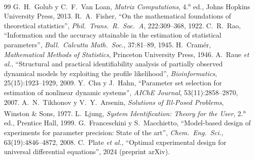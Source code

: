 \documentclass[11pt,a4paper]{article}
\begin{document}
\begin{thebibliography}{99}
 G.~H.~Golub y C.~F.~Van Loan, \emph{Matrix Computations}, 4.\textsuperscript{a} ed., Johns Hopkins University Press, 2013.
 R.~A.~Fisher, ``On the mathematical foundations of theoretical statistics'', \emph{Phil.\ Trans.\ R.\ Soc.\ A}, 222:309--368, 1922.
 C.~R.~Rao, ``Information and the accuracy attainable in the estimation of statistical parameters'', \emph{Bull.\ Calcutta Math.\ Soc.}, 37:81--89, 1945.
 H.~Cramér, \emph{Mathematical Methods of Statistics}, Princeton University Press, 1946.
 A.~Raue \emph{et al.}, ``Structural and practical identifiability analysis of partially observed dynamical models by exploiting the profile likelihood'', \emph{Bioinformatics}, 25(15):1923--1929, 2009.
 Y.~Chu y J.~Hahn, ``Parameter set selection for estimation of nonlinear dynamic systems'', \emph{AIChE Journal}, 53(11):2858--2870, 2007.
 A.~N.~Tikhonov y V.~Y.~Arsenin, \emph{Solutions of Ill-Posed Problems}, Winston \& Sons, 1977.
 L.~Ljung, \emph{System Identification: Theory for the User}, 2.\textsuperscript{a} ed., Prentice Hall, 1999.
 G.~Franceschini y S.~Macchietto, ``Model-based design of experiments for parameter precision: State of the art'', \emph{Chem.\ Eng.\ Sci.}, 63(19):4846--4872, 2008.
 C.~Plate \emph{et al.}, ``Optimal experimental design for universal differential equations'', 2024 (preprint arXiv).
\end{thebibliography}
\end{document}
